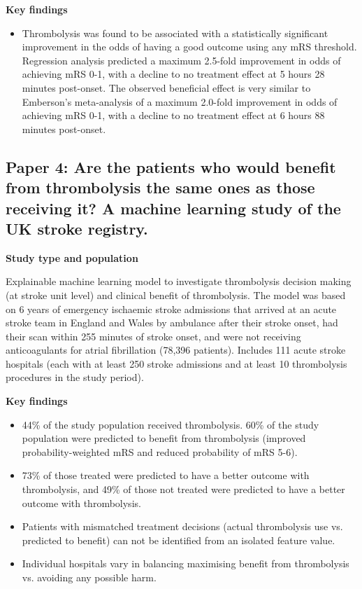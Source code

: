 \textbf{Key findings}

\begin{itemize}
    \item Thrombolysis was found to be associated with a statistically significant improvement in the odds of having a good outcome using any mRS threshold. Regression analysis predicted a maximum 2.5-fold improvement in odds of achieving mRS 0-1, with a decline to no treatment effect at 5 hours 28 minutes post-onset. The observed beneficial effect is very similar to Emberson’s meta-analysis of a maximum 2.0-fold improvement in odds of achieving mRS 0-1, with a decline to no treatment effect at 6 hours 88 minutes post-onset.
    
\end{itemize}

\subsection{Paper 4: Are the patients who would benefit from thrombolysis the same ones as those receiving it? A machine learning study of the UK stroke registry.\cite{pearn_are_2024}}

\textbf{Study type and population}

Explainable machine learning model to investigate thrombolysis decision making (at stroke unit level) and clinical benefit of thrombolysis. The model was based on 6 years of emergency ischaemic stroke admissions that arrived at an acute stroke team in England and Wales by ambulance after their stroke onset, had their scan within 255 minutes of stroke onset, and were not receiving anticoagulants for atrial fibrillation (78,396 patients). Includes 111 acute stroke hospitals (each with at least 250 stroke admissions and at least 10 thrombolysis procedures in the study period).

\textbf{Key findings}

\begin{itemize}
    \item 44\% of the study population received thrombolysis. 60\% of the study population were predicted to benefit from thrombolysis (improved probability-weighted mRS and reduced probability of mRS 5-6).
    
    \item 73\% of those treated were predicted to have a better outcome with thrombolysis, and 49\% of those not treated were predicted to have a better outcome with thrombolysis.
    
    \item Patients with mismatched treatment decisions (actual thrombolysis use vs. predicted to benefit) can not be identified from an isolated feature value.
    
    \item Individual hospitals vary in balancing maximising benefit from thrombolysis vs. avoiding any possible harm.
\end{itemize}

